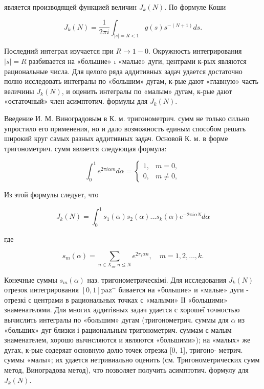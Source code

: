 \documentclass[10pt]{article}
\begin{document}
является производящей функцией величин $J_{k}(N)$. По формуле Коши



\[

J_{k}(N)=\frac{1}{2 \pi i} \int_{|s|=R<1} g(s) s^{-(N+1)} d s .

\]



Последний интеграл изучается при $R \rightarrow 1-0$. Окружность интегрирования $|s|=R$ разбивается на «большие» ı «малые» дуги, центрами к-рых являются рациональные числа. Для целого ряда аддитивных задач удается достаточно полно исследовать интегралы по «большим» дугам, к-рые дают «главную» часть величины $J_{k}(N)$, и оценить интегралы по «малым» дугам, к-рые дают «остаточный» член асимптотич. формулы для $J_{k}(N)$.



Введение И. М. Виноградовым в К. м. тригонометрич. сумм не только сильно упростило его применения, но и дало возможность единым способом решать широкий круг самых разных аддитивных задач. Основой К. м. в форме тригонометрич. сумм является следующая формула:



\[

\int_{0}^{1} e^{2 \pi i \alpha m} d \alpha= \begin{cases}1, & m=0, \\ 0, & m \neq 0,\end{cases}

\]



Из этой формулы следует, что



\[

J_{k}(N)=\int_{0}^{1} s_{1}(\alpha) s_{2}(\alpha) \ldots s_{k}(\alpha) e^{-2 \pi i \alpha N} d \alpha

\]



где



\[

s_{m}(\alpha)=\sum_{n \in X_{m}, n \leqslant N} e^{2 \pi_{i} \alpha n}, \quad m=1,2, \ldots, k .

\]



Конечные суммы $s_{m}(\alpha)$ наз. тригонометрическімі. Для исследования $J_{k}(N)$ отрезок интегрирования $[0,1] \mathrm{paz}^{-}$ бивается на «большие» и «малые» дуги - отрезкі с центрами в рациональных точках с «малыми» ІІ «большими» знаменателями. Для многих аддитівных задач удается с хорошеї точностью вычислить интегралы по «большим» дугам (тригонометрич. суммы для $\alpha$ из «больших» дуг близки і рациональным тригонометрич. суммам с малым знаменателем, хорошо вычнсляются и являются «большими»); на «малых» же дугах, к-рые содеряат основную долю точек отрезка [0, 1], тригоно- метрич. суммы «малы»; их удается нетривиально оценить (см. Тригонометрических сумм метод, Виноградова метод), что позволяет получить асимптотич. формулу для $J_{k}(N)$.
\end{document}
